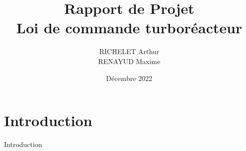 \documentclass{report}
\title{Rapport de Projet\\Loi de commande turboréacteur }
\author{RICHELET Arthur\\RENAYUD Maxime\\}
\date{Décembre 2022}
\begin{document}
\maketitle

\tableofcontents

\section{Introduction}
Introduction
\end{document}
